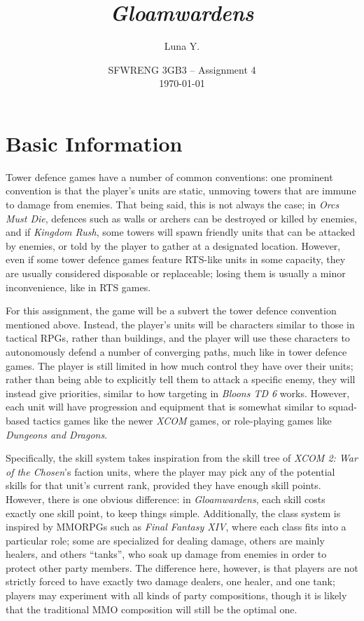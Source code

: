 \documentclass[10pt]{article}
\begin{document}
\title{\textit{Gloamwardens}}
\author{Luna Y.}
\date{
    SFWRENG 3GB3 -- Assignment 4\\[0.25cm]
    \today
}
\maketitle

\tableofcontents

\section{Basic Information}

Tower defence games have a number of common conventions: one prominent convention is that the player's units are static, unmoving towers
that are immune to damage from enemies. That being said, this is not always the case; in \textit{Orcs Must Die}, defences such as walls
or archers can be destroyed or killed by enemies, and if \textit{Kingdom Rush}, some towers will spawn friendly units that can be attacked by
enemies, or told by the player to gather at a designated location. However, even if some tower defence games feature RTS-like units in some
capacity, they are usually considered disposable or replaceable; losing them is usually a minor inconvenience, like in RTS games.

For this assignment, the game will be a subvert the tower defence convention mentioned above. Instead, the player's units will be
characters similar to those in tactical RPGs, rather than buildings, and the player will use these characters to autonomously defend
a number of converging paths, much like in tower defence games. The player is still limited in how much control they have over their units;
rather than being able to explicitly tell them to attack a specific enemy, they will instead give priorities, similar to how targeting
in \textit{Bloons TD 6} works. However, each unit will have progression and equipment that is somewhat similar to squad-based tactics games
like the newer \textit{XCOM} games, or role-playing games like \textit{Dungeons and Dragons}.

Specifically, the skill system takes inspiration from the skill tree of \textit{XCOM 2: War of the Chosen}'s faction units,
where the player may pick any of the potential skills for that unit's current rank, provided they have enough skill points.
However, there is one obvious difference: in \textit{Gloamwardens}, each skill costs exactly one skill point, to keep things simple.
Additionally, the class system is inspired by MMORPGs such as \textit{Final Fantasy XIV}, where each class fits into a particular role;
some are specialized for dealing damage, others are mainly healers, and others ``tanks'', who soak up damage from enemies in order
to protect other party members. The difference here, however, is that players are not strictly forced to have exactly two
damage dealers, one healer, and one tank; players may experiment with all kinds of party compositions, though it is
likely that the traditional MMO composition will still be the optimal one.
\end{document}
